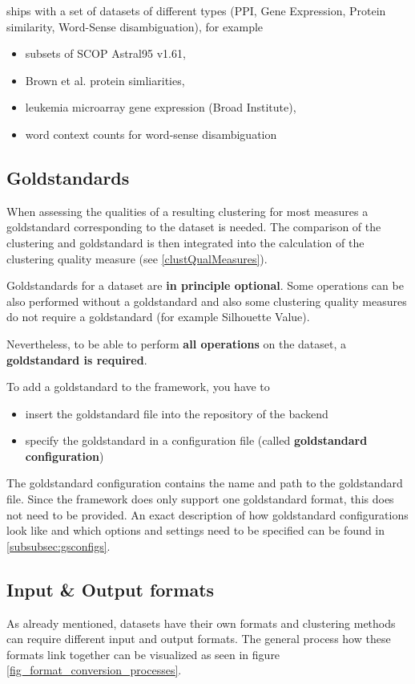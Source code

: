\clusteval ships with a set of datasets of different types (PPI, Gene Expression, Protein similarity, Word-Sense disambiguation), for example 
	\begin{itemize}
		\item subsets of SCOP Astral95 v1.61,
		\item Brown et al. protein simliarities,
		\item leukemia microarray gene expression (Broad Institute),
		\item word context counts for word-sense disambiguation
	\end{itemize}
	
	\subsection{Goldstandards}\label{subsec:goldstandards}
	When assessing the qualities of a resulting clustering for most measures a goldstandard corresponding to the dataset is needed. The comparison of the clustering and goldstandard is then integrated into the calculation of the clustering quality measure (see \ref{clustQualMeasures}).
	
	Goldstandards for a dataset are \textbf{in principle optional}. Some operations can be also performed without a goldstandard and also some clustering quality measures do not require a goldstandard (for example Silhouette Value).
	
	Nevertheless, to be able to perform \textbf{all operations} on the dataset, a \textbf{goldstandard is required}.
	
	To add a goldstandard to the framework, you have to
	\begin{itemize}
		\item insert the goldstandard file into the repository of the backend
		\item specify the goldstandard in a configuration file (called \textbf{goldstandard configuration})
	\end{itemize}
	The goldstandard configuration contains the name and path to the goldstandard file. Since the framework does only support one goldstandard format, this does not need to be provided. An exact description of how goldstandard configurations look like and which options and settings need to be specified can be found in \ref{subsubsec:gsconfigs}.
	
	\subsection{Input \& Output formats}\label{formats}
	As already mentioned, datasets have their own formats and clustering methods can require different input and output formats. The general process how these formats link together can be visualized as seen in figure \ref{fig_format_conversion_processes}. 
	

